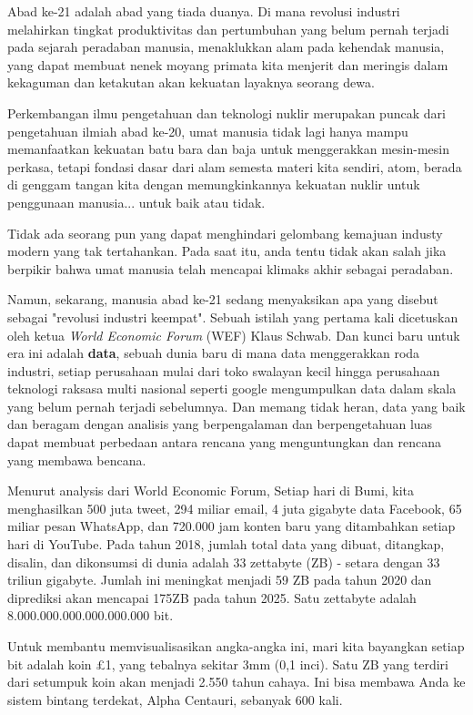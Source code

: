 \thispagestyle{plain}

Abad ke-21 adalah abad yang tiada duanya.
Di mana revolusi industri melahirkan tingkat produktivitas dan pertumbuhan yang belum pernah terjadi pada sejarah peradaban manusia,
menaklukkan alam pada kehendak manusia, yang dapat membuat nenek moyang primata kita menjerit dan meringis
dalam kekaguman dan ketakutan akan kekuatan layaknya seorang dewa. 

Perkembangan ilmu pengetahuan dan teknologi nuklir merupakan puncak dari pengetahuan ilmiah abad ke-20,
umat manusia tidak lagi hanya mampu memanfaatkan kekuatan batu bara dan baja untuk menggerakkan mesin-mesin perkasa,
tetapi fondasi dasar dari alam semesta materi kita sendiri, atom, berada di genggam tangan kita dengan memungkinkannya kekuatan nuklir untuk penggunaan manusia... untuk baik atau tidak.

Tidak ada seorang pun yang dapat menghindari gelombang kemajuan industy modern yang tak tertahankan.
Pada saat itu, anda tentu tidak akan salah jika berpikir bahwa umat manusia telah mencapai klimaks akhir sebagai peradaban.

Namun, sekarang, manusia abad ke-21 sedang menyaksikan apa yang disebut sebagai
"revolusi industri keempat". Sebuah istilah yang pertama kali dicetuskan oleh
ketua \emph{World Economic Forum} (WEF) Klaus Schwab. Dan kunci baru untuk era ini adalah \textbf{data}, 
sebuah dunia baru di mana data menggerakkan roda industri, 
setiap perusahaan mulai dari toko swalayan kecil hingga
perusahaan teknologi raksasa multi nasional seperti google mengumpulkan data dalam skala 
yang belum pernah terjadi sebelumnya. Dan memang tidak heran, 
data yang baik dan beragam dengan analisis yang berpengalaman dan berpengetahuan
luas dapat membuat perbedaan antara rencana yang menguntungkan dan rencana yang membawa bencana.

Menurut analysis dari World Economic Forum, Setiap hari di Bumi,
kita menghasilkan 500 juta tweet, 294 miliar email,
4 juta gigabyte data Facebook, 65 miliar pesan WhatsApp, 
dan 720.000 jam konten baru yang ditambahkan setiap hari di YouTube. Pada tahun 2018, 
jumlah total data yang dibuat, ditangkap, disalin, dan dikonsumsi di dunia adalah 33 zettabyte (ZB) - 
setara dengan 33 triliun gigabyte. Jumlah ini meningkat menjadi 59 ZB pada tahun 2020 dan diprediksi akan 
mencapai 175ZB pada tahun 2025. Satu zettabyte adalah 8.000.000.000.000.000.000 bit.

Untuk membantu memvisualisasikan angka-angka ini, 
mari kita bayangkan setiap bit adalah koin £1, yang tebalnya sekitar 3mm (0,1 inci).
Satu ZB yang terdiri dari setumpuk koin akan menjadi 2.550 tahun cahaya. 
Ini bisa membawa Anda ke sistem bintang terdekat, Alpha Centauri, sebanyak 600 kali.

